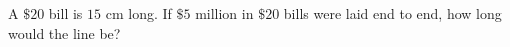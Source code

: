 A $\$20$ bill is $15$ cm long. If $\$5$ million in $\$20$ bills were laid end to end, how long would the line be?
